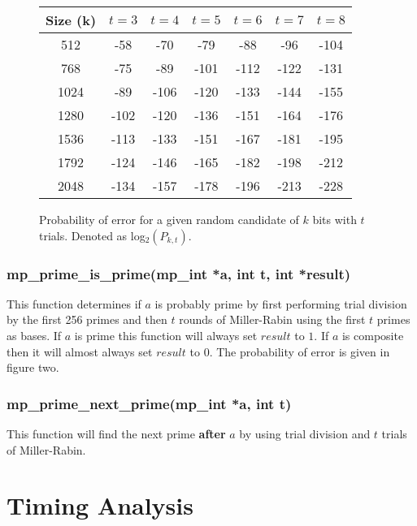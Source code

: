 \documentclass{article}
\begin{document}
\begin{figure}[here]
\begin{small}
\begin{center}
\begin{tabular}{|c|c|c|c|c|c|c|}
\hline \textbf{Size (k)} & \textbf{$t = 3$} & \textbf{$t = 4$} & \textbf{$t = 5$} & \textbf{$t = 6$} & \textbf{$t = 7$} & \textbf{$t = 8$}\\
\hline 512  & -58 & -70 & -79 & -88 & -96 & -104 \\
\hline 768  & -75 & -89 & -101 & -112 & -122 & -131\\
\hline 1024 & -89 & -106 & -120 & -133 & -144 & -155 \\
\hline 1280 & -102 & -120 & -136 & -151 & -164 & -176 \\
\hline 1536 & -113 & -133 & -151 & -167 & -181 & -195 \\
\hline 1792 & -124 & -146 & -165 & -182 & -198 & -212 \\
\hline 2048 & -134 & -157 & -178 & -196 & -213 & -228\\
\hline
\end{tabular}
\end{center}
\end{small}
\caption{Probability of error for a given random candidate of $k$ bits with $t$ trials.  Denoted as 
log$_2(P_{k,t})$. }
\end{figure}

\subsubsection{mp\_prime\_is\_prime(mp\_int *a, int t, int *result)}
This function determines if $a$ is probably prime by first performing trial division by the first 256 
primes and then $t$ rounds of Miller-Rabin using the first $t$ primes as bases.  If $a$ is prime this
function will always set $result$ to $1$.  If $a$ is composite then it will almost always set $result$
to $0$.  The probability of error is given in figure two.

\subsubsection{mp\_prime\_next\_prime(mp\_int *a, int t)}
This function will find the next prime \textbf{after} $a$ by using trial division and $t$ trials of 
Miller-Rabin.  

\section{Timing Analysis}
\end{document}
